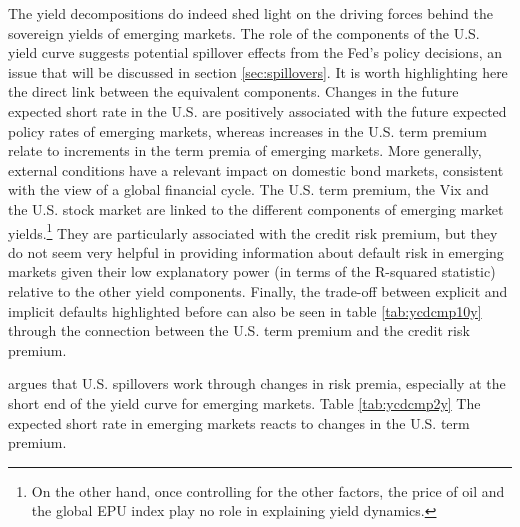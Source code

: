 {The yield decompositions do indeed shed light on the driving forces behind the sovereign yields of emerging markets.
The role of the components of the U.S. yield curve %
suggests potential spillover effects from the Fed's policy decisions, an issue that will be discussed in section \ref{sec:spillovers}.
It is worth highlighting here the direct link between the equivalent components. Changes in the future expected short rate in the U.S. are positively associated with the future expected policy rates of emerging markets, whereas increases in the U.S. term premium relate to increments in the term premia of emerging markets.
More generally, external conditions have a relevant impact on domestic bond markets, consistent with the view of a global financial cycle.
The U.S. term premium, the Vix and the U.S. stock market are linked to the different components of emerging market yields.\footnote{ On the other hand, once controlling for the other factors, the price of oil and the global EPU index play no role in explaining yield dynamics.}
They are particularly associated with the credit risk premium, 
but they do not seem very helpful in providing information about default risk in emerging markets given their low explanatory power (in terms of the R-squared statistic) relative to the other yield components.
Finally, the trade-off between explicit and implicit defaults highlighted before can also be seen in table \ref{tab:ycdcmp10y} through the connection between the U.S. term premium and the credit risk premium.

\cite{Kalemli-Ozcan:2019} argues that U.S. spillovers work through changes in risk premia, especially at the short end of the yield curve for emerging markets.
Table \ref{tab:ycdcmp2y}
The expected short rate in emerging markets reacts to changes in the U.S. term premium. 

}
